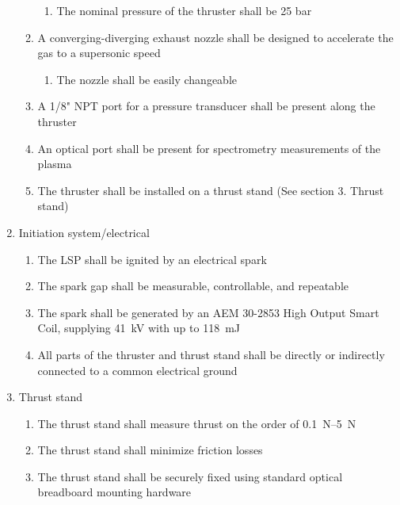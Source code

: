 \begin{enumerate}
\begin{enumerate}
                    \begin{enumerate}
                        \item The nominal pressure of the thruster shall be 25 bar
                    \end{enumerate}
                    \item A converging-diverging exhaust nozzle shall be designed to accelerate the gas to a supersonic speed
                    \begin{enumerate}
                        \item The nozzle shall be easily changeable
                    \end{enumerate}
                    \item A 1/8" NPT port for a pressure transducer shall be present along the thruster
                    \item An optical port shall be present for spectrometry measurements of the plasma
                    \item The thruster shall be installed on a thrust stand (See section 3. Thrust stand)
                \end{enumerate}
                \item Initiation system/electrical
                \begin{enumerate}
                    \item The LSP shall be ignited by an electrical spark
                    \item The spark gap shall be measurable, controllable, and repeatable
                    \item The spark shall be generated by an AEM 30-2853 High Output Smart Coil, supplying \qty{41}{kV} with up to \qty{118}{mJ}
                    \item All parts of the thruster and thrust stand shall be directly or indirectly connected to a common electrical ground
                \end{enumerate}
                \item Thrust stand
                \begin{enumerate}
                    \item The thrust stand shall measure thrust on the order of \qtyrange{0.1}{5}{N}
                    \item The thrust stand shall minimize friction losses
                    \item The thrust stand shall be securely fixed using standard optical breadboard mounting hardware
                \end{enumerate}
            \end{enumerate}

